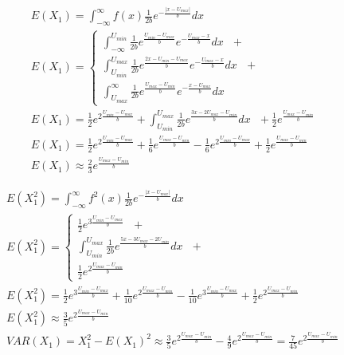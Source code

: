 \documentclass[11pt]{article}
\begin{document}
\begin{align}
E(X_1) = \int_{-\infty}^{\infty} f(x)  \frac{1 }{2b}e^{-\frac{| x - U_{max}|}{b}}  dx \\
 E(X_1) = \left\{
 \begin{matrix} 
 \int_{-\infty}^{U_{min}}   \frac{1 }{2b} e^{\frac{U_{min} - U_{max}}{b}} e^{-\frac{U_{max} - x}{b}}  dx   \text{  } + \\ 
 \int_{U_{min}}^{U_{max}}    \frac{1 }{2b} e^{\frac{2x - U_{min} - U_{max}}{b}} e^{-\frac{U_{max} - x}{b}}  dx  \text{  } + \\
  \int_{U_{max}}^{\infty}    \frac{1}{2b} e^{\frac{U_{max} -U_{min}}{b}} e^{-\frac{x - U_{max}}{b}}  dx 
  \end{matrix}\right. \\
  E(X_1) = \frac{1}{2}e^{2\frac{U_{min} - U_{max}}{b}} + \int_{U_{min}}^{U_{max}}    \frac{1 }{2b} e^{\frac{3x -  2U_{max} - U_{min}}{b}}  dx  \text{  } +  \frac{1}{2}  e^{\frac{U_{max} -U_{min}}{b}} \\
  E(X_1) = \frac{1}{2}e^{2\frac{U_{min} - U_{max}}{b}} +   \frac{1}{6}e^{\frac{U_{max} - U_{min}}{b}}   -   \frac{1}{6}e^{2\frac{U_{min} - U_{max}}{b}}   +  \frac{1}{2}  e^{\frac{U_{max} -U_{min}}{b}} \\
  E(X_1)  \approx  \frac{2}{3}e^{\frac{U_{max} - U_{min}}{b}}  
\end{align}

\begin{align}
E(X^2_1) = \int_{-\infty}^{\infty} f^2(x)  \frac{1 }{2b}e^{-\frac{| x - U_{max}|}{b}}  dx \\
 E(X^2_1) = \left\{
 \begin{matrix} 
 \frac{1}{2}e^{3\frac{U_{min} - U_{max}}{b}}   \text{  } + \\ 
 \int_{U_{min}}^{U_{max}}    \frac{1 }{2b} e^{\frac{5x -  3U_{max} - 2U_{min}}{b}}  dx  \text{  } + \\
 \frac{1}{2}e^{2\frac{U_{max} - U_{min}}{b}}
  \end{matrix}\right. \\
   E(X^2_1) =   \frac{1}{2}e^{3\frac{U_{min} - U_{max}}{b}}  +  \frac{1}{10}e^{2\frac{U_{max} - U_{min}}{b}}   -   \frac{1}{10}e^{3\frac{U_{min} - U_{max}}{b}}   +  \frac{1}{2}e^{2\frac{U_{max} - U_{min}}{b}}\\
  E(X^2_1) \approx   \frac{3}{5}e^{2\frac{U_{max} - U_{min}}{b}} \\
  VAR(X_1) = X^2_1 - E(X_1)^2 \approx  \frac{3}{5}e^{2\frac{U_{max} - U_{min}}{b}} -  \frac{4}{9}e^{2\frac{U_{max} - U_{min}}{b}} =  \frac{7}{45} e^{2\frac{U_{max} - U_{min}}{b}} 
\end{align}
\end{document}
